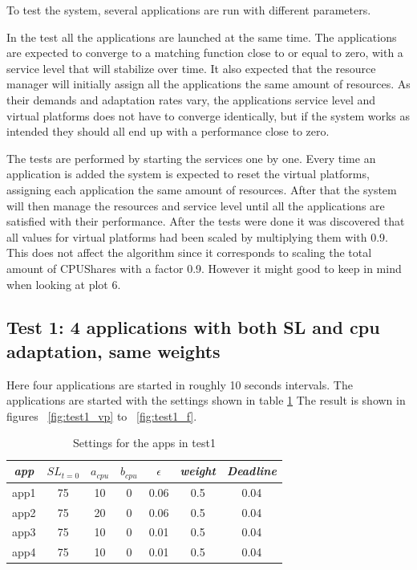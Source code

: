 \documentclass[nobiblatex]{LTHthesis}
\begin{document}
To test the system, several applications are run with different parameters.

In the test all the applications are launched at the same time. The applications are expected to converge to a matching function close to or equal to zero, with a service level that will stabilize over time. It also expected that the resource manager will initially assign all the applications the same amount of resources. As their demands and adaptation rates vary, the applications service level and virtual platforms does not have to converge identically, but if the system works as intended they should all end up with a performance close to zero.

The tests are performed by starting the services one by one. Every time an application is added the system is expected to reset the virtual platforms, assigning each application the same amount of resources. After that the system will then manage the resources and service level until all the applications are satisfied with their performance. After the tests were done it was discovered that all values for virtual platforms had been scaled by multiplying them with 0.9. This does not affect the algorithm since it corresponds to scaling the total amount of CPUShares with a factor 0.9. However it might good to keep in mind when looking at plot 6.



\subsection{Test 1: 4 applications with both SL and cpu adaptation, same weights}

Here four applications are started in roughly 10 seconds intervals. The applications are started with the settings shown in table \ref{tab:settings_test1}
The result is shown in figures ~\ref{fig:test1_vp} to ~\ref{fig:test1_f}. 
\begin{table}[h]
  \centering
  \begin{tabular}{|c|c|c|c|c|c|c|}
 	\hline 
   \emph{app} & $SL_{t=0}$ & \textbf{$a_{cpu}$} & \textbf{$b_{cpu}$} & \textbf{$\epsilon$} & \emph{weight} & \emph{Deadline} \\ \hline
	app1 & 75 & 10 & 0 & 0.06 & 0.5 &0.04  \\ \hline
	app2 & 75 & 20 & 0 & 0.06 & 0.5 &0.04  \\ \hline
	app3 & 75 & 10 & 0 & 0.01 & 0.5 &0.04  \\ \hline
	app4 & 75 & 10 & 0 & 0.01 & 0.5 &0.04  \\ \hline        
  \end{tabular}
  \caption{Settings for the apps in test1}
  \label{tab:settings_test1}
\end{table}
\end{document}
